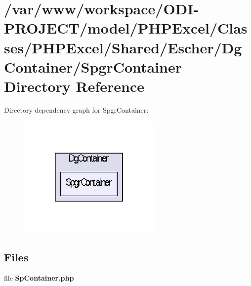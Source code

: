 \section{/var/www/workspace/\+O\+D\+I-\/\+P\+R\+O\+J\+E\+C\+T/model/\+P\+H\+P\+Excel/\+Classes/\+P\+H\+P\+Excel/\+Shared/\+Escher/\+Dg\+Container/\+Spgr\+Container Directory Reference}
\label{dir_f98ba7627ceba2fcb4520f07d37e4a8b}
Directory dependency graph for Spgr\+Container\+:\nopagebreak
\begin{figure}[H]
\begin{center}
\leavevmode
\includegraphics[width=198pt]{dir_f98ba7627ceba2fcb4520f07d37e4a8b_dep}
\end{center}
\end{figure}
\subsection*{Files}
\begin{DoxyCompactItemize}
\item 
file {\bfseries Sp\+Container.\+php}
\end{DoxyCompactItemize}
